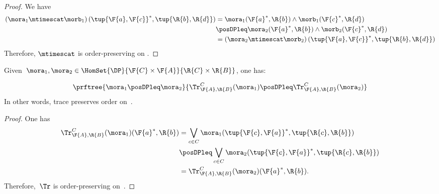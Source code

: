 \begin{proof}
  We have
  \begin{equation}
    \label{eq:tens_pres_ord}
    \begin{aligned}
      \left( \mora_1\mtimescat \morb_1\right) (\tup{\F{a},\F{c}}^*,\tup{\R{b},\R{d}})&=\mora_1(\F{a}^*,\R{b})\wedge \morb_1(\F{c}^*,\R{d})\\
      &\posDPleq \mora_2(\F{a}^*,\R{b})\wedge \morb_2(\F{c}^*,\R{d})\\
      &=\left( \mora_2\mtimescat \morb_2\right) (\tup{\F{a},\F{c}}^*,\tup{\R{b},\R{d}})
    \end{aligned}
  \end{equation}
  Therefore, $\mtimescat$ is order-preserving on \DP.
\end{proof}

\begin{lemma}
  \label{lem:trace_pres_order}
  Given~$\mora_1,\mora_2\in \HomSet{\DP}{\F{C}\times \F{A}}{\R{C}\times \R{B}}$, one has:

  \begin{equation}
    \prftree{\mora_1\posDPleq \mora_2}{\Tr_{\F{A},\R{B}}^C(\mora_1)\posDPleq \Tr_{\F{A},\R{B}}^C(\mora_2)}
  \end{equation}
  In other words, trace preserves order on~\DP.
\end{lemma}

\begin{proof}
  One has
  \begin{equation}
     \label{eq:trace_pres_ord}
    \begin{aligned}
      \Tr_{\F{A},\R{B}}^C(\mora_1)(\F{a}^*,\R{b})&=\bigvee_{c\in C}\mora_1(\tup{\F{c},\F{a}}^*,\tup{\R{c},\R{b}})\\
      &\posDPleq \bigvee_{c\in C}\mora_2(\tup{\F{c},\F{a}}^*,\tup{\R{c},\R{b}})\\
      &=\Tr_{\F{A},\R{B}}^C(\mora_2)(\F{a}^*,\R{b}).
    \end{aligned}
  \end{equation}
  Therefore,~$\Tr$ is order-preserving on~\DP.
\end{proof}